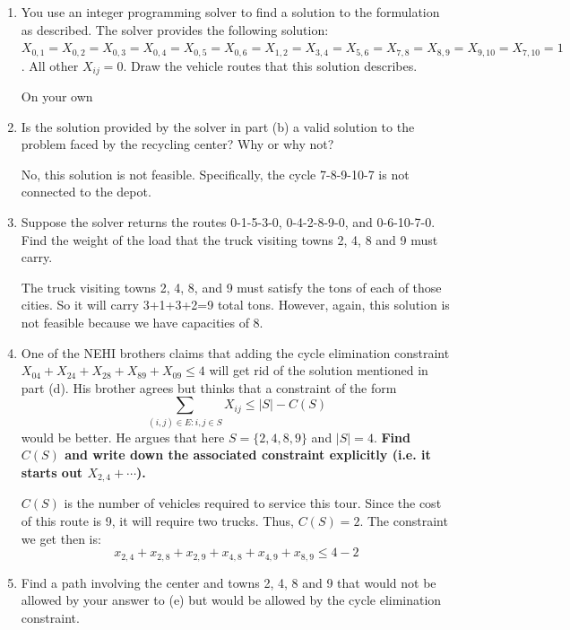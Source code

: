 \documentclass[letterpaper,oneside,12pt]{article}%
\newcommand{\blu}{\color{blue}}
\begin{document}
\begin{enumerate}
\begin{enumerate}
{}


\item You use an integer programming solver to find a solution to the formulation as described. The solver provides the following solution: $X_{0,1}=X_{0,2}=X_{0,3}=X_{0,4}=X_{0,5}=X_{0,6}=X_{1,2}=X_{3,4}=X_{5,6}=X_{7,8}=X_{8,9}=X_{9,10}=X_{7,10}=1$.  All other $X_{ij} = 0$.  Draw the vehicle routes that this solution describes.

{
\blu
On your own
}

\item Is the solution provided by the solver in part (b) a valid solution to the problem faced by the recycling center? Why or why not?  
{
\blu

No, this solution is not feasible. Specifically, the cycle 7-8-9-10-7 is not connected to the depot.

}
\item Suppose the solver returns the routes 0-1-5-3-0, 0-4-2-8-9-0, and 0-6-10-7-0. Find the weight of the load that the truck visiting towns 2, 4, 8 and 9 must carry. 

{
\blu
The truck visiting towns 2, 4, 8, and 9 must satisfy the tons of each of those cities. So it will carry 3+1+3+2=9 total tons. However, again, this solution is not feasible because we have capacities of 8.

}

\item One of the NEHI brothers claims that adding the cycle elimination constraint $X_{04} + X_{24} + X_{28} + X_{89} + X_{09} \leq 4$ will get rid of the solution mentioned in part (d). His brother agrees but thinks that a constraint of the form   
\[
\sum_{(i,j)\in E: i,j \in S} X_{ij} \le |S| - C(S)
\]
would be better. He argues that here $S = \{2,4,8,9\}$ and $|S| = 4$. {\bf Find $C(S)$ and write down the associated constraint explicitly (i.e. it starts out $X_{2,4}+\cdots$).}

{
\blu

$C(S)$ is the number of vehicles required to service this tour. Since the cost of this route is 9, it will require two trucks. Thus, $C(S) = 2$. The constraint we get then is:
\[
x_{2,4} + x_{2,8} + x_{2,9} + x_{4,8} + x_{4,9} + x_{8,9} \leq 4 - 2 
\]
}

\item Find a path involving the center and towns 2, 4, 8 and 9 that would not be allowed by your answer to (e) but would be allowed by the cycle elimination constraint. 
{\blu

}
\end{enumerate}
\end{enumerate}
\end{document}
